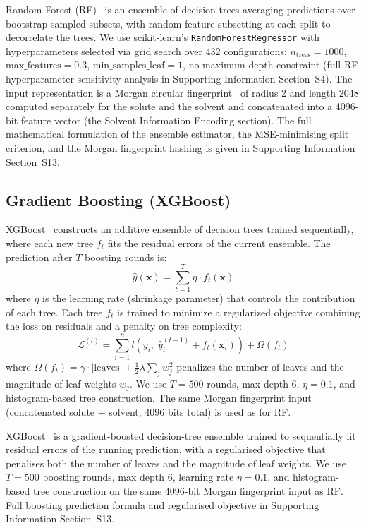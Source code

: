 \documentclass[journal=jcisd8,manuscript=article]{achemso}
\newcommand{\vect}[1]{\mathbf{#1}}
\newcommand{\added}[1]{{\color{addedblue}#1}}
\newcommand{\removed}[1]{{\color{removedred}#1}}
\begin{document}
\added{Random Forest (RF)~\cite{breiman2001random} is an ensemble of decision trees averaging predictions over bootstrap-sampled subsets, with random feature subsetting at each split to decorrelate the trees. We use scikit-learn's \texttt{RandomForestRegressor} with hyperparameters selected via grid search over 432 configurations: $n_\text{trees} = 1000$, $\text{max\_features} = 0.3$, $\text{min\_samples\_leaf} = 1$, no maximum depth constraint (full RF hyperparameter sensitivity analysis in Supporting Information Section~S4). The input representation is a Morgan circular fingerprint~\cite{rogers2010extended} of radius 2 and length 2048 computed separately for the solute and the solvent and concatenated into a 4096-bit feature vector (the Solvent Information Encoding section). The full mathematical formulation of the ensemble estimator, the MSE-minimising split criterion, and the Morgan fingerprint hashing is given in Supporting Information Section~S13.}


\subsection{Gradient Boosting (XGBoost)}
\label{sec:xgboost}

\removed{XGBoost~\cite{chen2016xgboost} constructs an additive ensemble of decision trees trained sequentially, where each new tree $f_t$ fits the residual errors of the current ensemble.
The prediction after $T$ boosting rounds is:
\begin{equation}
 \hat{y}(\vect{x}) = \sum_{t=1}^{T} \eta \cdot f_t(\vect{x})
\end{equation}
where $\eta$ is the learning rate (shrinkage parameter) that controls the contribution of each tree.
Each tree $f_t$ is trained to minimize a regularized objective combining the loss on residuals and a penalty on tree complexity:
\begin{equation}
 \mathcal{L}^{(t)} = \sum_{i=1}^{n} l\!\left(y_i,\; \hat{y}_i^{(t-1)} + f_t(\vect{x}_i)\right) + \Omega(f_t)
\end{equation}
where $\Omega(f_t) = \gamma \cdot |\text{leaves}| + \tfrac{1}{2}\lambda \sum_j w_j^2$ penalizes the number of leaves and the magnitude of leaf weights $w_j$.
We use $T = 500$ rounds, max depth 6, $\eta = 0.1$, and histogram-based tree construction.
The same Morgan fingerprint input (concatenated solute + solvent, 4096 bits total) is used as for RF.}

\added{XGBoost~\cite{chen2016xgboost} is a gradient-boosted decision-tree ensemble trained to sequentially fit residual errors of the running prediction, with a regularised objective that penalises both the number of leaves and the magnitude of leaf weights. We use $T = 500$ boosting rounds, max depth 6, learning rate $\eta = 0.1$, and histogram-based tree construction on the same 4096-bit Morgan fingerprint input as RF. Full boosting prediction formula and regularised objective in Supporting Information Section~S13.}
\end{document}
